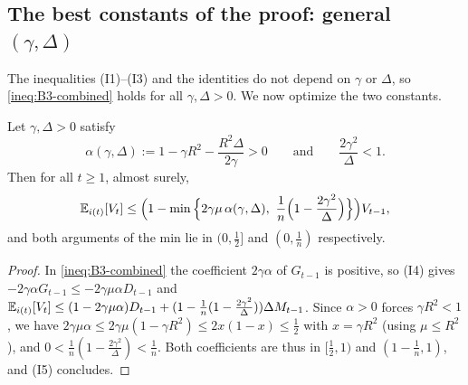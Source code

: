 \subsection{The best constants of the proof: general \texorpdfstring{$(\gamma,\Delta)$}{(gamma,Delta)}}\label{sec:B3-constants}

The inequalities (I1)--(I3) and the identities do not depend on $\gamma$ or $\Delta$, so \eqref{ineq:B3-combined} holds for all $\gamma,\Delta>0$. We now optimize the two constants.

\begin{proposition}\label{prop:B3-general}
Let $\gamma,\Delta>0$ satisfy
\[
\alpha(\gamma,\Delta):=1-\gamma R^2-\frac{R^2\Delta}{2\gamma}>0\qquad\text{and}\qquad \frac{2\gamma^2}{\Delta}<1 .
\]
Then for all $t\ge1$, almost surely,
\begin{equation}\label{ineq:B3-general}
\Ei[V_t]\le\Big(1-\min\Big\{2\gamma\mu\,\alpha(\gamma,\Delta),\ \frac1n\Big(1-\frac{2\gamma^2}{\Delta}\Big)\Big\}\Big)V_{t-1},
\end{equation}
and both arguments of the min lie in $(0,\frac12]$ and $(0,\frac1n)$ respectively.
\end{proposition}
\begin{proof}
In \eqref{ineq:B3-combined} the coefficient $2\gamma\alpha$ of $G_{t-1}$ is positive, so (I4) gives $-2\gamma\alpha G_{t-1}\le-2\gamma\mu\alpha D_{t-1}$ and $\mathbb{E}_{i(t)}[V_t]\le(1-2\gamma\mu\alpha)D_{t-1}+(1-\frac1n(1-\frac{2\gamma^2}{\Delta}))\Delta M_{t-1}$. Since $\alpha>0$ forces $\gamma R^2<1$, we have $2\gamma\mu\alpha\le2\gamma\mu(1-\gamma R^2)\le2x(1-x)\le\frac12$ with $x=\gamma R^2$ (using $\mu\le R^2$), and $0<\frac1n(1-\frac{2\gamma^2}\Delta)<\frac1n$. Both coefficients are thus in $[\frac12,1)$ and $(1-\frac1n,1)$, and (I5) concludes.
\end{proof}

